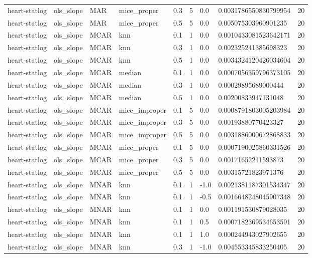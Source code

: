 \begin{tabular}{lllllllll}
heart-statlog & ols\_slope & MAR & mice\_proper & 0.3 & 5 & 0.0 & 0.0031786550830799954 & 20 \\
heart-statlog & ols\_slope & MAR & mice\_proper & 0.5 & 5 & 0.0 & 0.005075303960901235 & 20 \\
heart-statlog & ols\_slope & MCAR & knn & 0.1 & 1 & 0.0 & 0.0010433081523642171 & 20 \\
heart-statlog & ols\_slope & MCAR & knn & 0.3 & 1 & 0.0 & 0.002325241385698323 & 20 \\
heart-statlog & ols\_slope & MCAR & knn & 0.5 & 1 & 0.0 & 0.0034324120426034604 & 20 \\
heart-statlog & ols\_slope & MCAR & median & 0.1 & 1 & 0.0 & 0.0007056359796373105 & 20 \\
heart-statlog & ols\_slope & MCAR & median & 0.3 & 1 & 0.0 & 0.00029895689000444 & 20 \\
heart-statlog & ols\_slope & MCAR & median & 0.5 & 1 & 0.0 & 0.00200833947131048 & 20 \\
heart-statlog & ols\_slope & MCAR & mice\_improper & 0.1 & 5 & 0.0 & 0.0008791803005203984 & 20 \\
heart-statlog & ols\_slope & MCAR & mice\_improper & 0.3 & 5 & 0.0 & 0.00193880770423327 & 20 \\
heart-statlog & ols\_slope & MCAR & mice\_improper & 0.5 & 5 & 0.0 & 0.0031886000672868833 & 20 \\
heart-statlog & ols\_slope & MCAR & mice\_proper & 0.1 & 5 & 0.0 & 0.0007190025860331526 & 20 \\
heart-statlog & ols\_slope & MCAR & mice\_proper & 0.3 & 5 & 0.0 & 0.00171652211593873 & 20 \\
heart-statlog & ols\_slope & MCAR & mice\_proper & 0.5 & 5 & 0.0 & 0.00315721823971376 & 20 \\
heart-statlog & ols\_slope & MNAR & knn & 0.1 & 1 & -1.0 & 0.0021381187301534347 & 20 \\
heart-statlog & ols\_slope & MNAR & knn & 0.1 & 1 & -0.5 & 0.0016648248045907348 & 20 \\
heart-statlog & ols\_slope & MNAR & knn & 0.1 & 1 & 0.0 & 0.001191530879028035 & 20 \\
heart-statlog & ols\_slope & MNAR & knn & 0.1 & 1 & 0.5 & 0.0007182369534653591 & 20 \\
heart-statlog & ols\_slope & MNAR & knn & 0.1 & 1 & 1.0 & 0.000244943027902655 & 20 \\
heart-statlog & ols\_slope & MNAR & knn & 0.3 & 1 & -1.0 & 0.004553345833250405 & 20 \\

\end{tabular}
